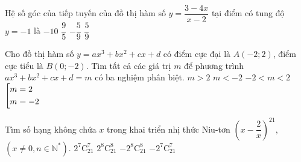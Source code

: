 \begin{ex}%
	Hệ số góc của tiếp tuyến của đồ thị hàm số $y=\dfrac{3-4x}{x-2}$ tại điểm có tung độ $y=-1$ là
	\choice
	{$-10$}
	{\True $\dfrac{9}{5}$}
	{$-\dfrac{5}{9}$}
	{$\dfrac{5}{9}$}
\end{ex}

\begin{ex}%
Cho đồ thị hàm số $y=ax^3+bx^2+cx+d$ có điểm cực đại là $A(-2;2)$, điểm cực tiểu là $B(0;-2)$. Tìm tất cả các giá trị $m$ để phương trình $ax^3+bx^2+cx+d=m$ có ba nghiệm phân biệt.
\choice
{$m>2$}
{$m<-2$}
{\True $-2<m<2$}
{$\left[\begin{aligned}&m=2\\ &m=-2
\end{aligned}\right.$}
\end{ex}

\begin{ex}%
Tìm số hạng không chứa $x$ trong khai triển nhị thức Niu-tơn $\left( x-\dfrac{2}{x}\right)^{21}$, $(x\neq 0, n\in \mathbb{N}^{*})$.
\choice
{$2^{7}\mathrm{C}_{21}^{7}$}
{$2^{8}\mathrm{C}_{21}^{8}$}
{$-2^{8}\mathrm{C}_{21}^{8}$}
{\True $-2^{7}\mathrm{C}_{21}^{7}$}
\end{ex}

